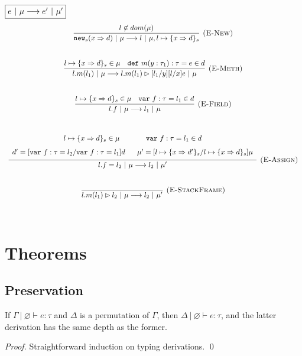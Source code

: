 \documentclass{llncs}
\newcommand{\keywadj}[1]{\mathtt{#1}}
\newcommand{\keyw}[1]{\keywadj{#1}~}
\begin{document}
$\fbox{$e~|~\mu \longrightarrow e'~|~\mu'$}$
\[
\begin{array}{c}
\infer[\textsc{(E-New)}]
  {\keywadj{new}_{s}(x \Rightarrow d)~|~\mu \longrightarrow l~|~\mu, l \mapsto \{ x \Rightarrow d \}_{s}}
  {l \not\in dom(\mu)}\\[5ex]

\infer[\textsc{(E-Meth)}]
  {l.m(l_1)~|~\mu \longrightarrow l.m(l_1) \rhd [l_1/y][l/x]e~|~\mu}
  {l \mapsto \{ x \Rightarrow d \}_{s} \in \mu & \keyw{def} m(y : \tau_1) : \tau = e \in d}\\[5ex]

\infer[\textsc{(E-Field)}]
  {l.f~|~\mu \longrightarrow l_1~|~\mu}
  {l \mapsto \{ x \Rightarrow d \}_{s} \in \mu & \keyw{var} f:\tau = l_1 \in d}\\[5ex]

\infer[\textsc{(E-Assign)}]
  {l.f = l_2~|~\mu \longrightarrow l_2~|~\mu'}
  {\def\arraystretch{1.6}
  \begin{array}{c}
l \mapsto \{ x \Rightarrow d \}_{s} \in \mu~~~~~~~~~~~\keyw{var} f:\tau = l_1 \in d \\
d' = [\keyw{var} f:\tau = l_2/\keyw{var} f:\tau = l_1]d~~~~~\mu' = [l \mapsto \{ x \Rightarrow d' \}_{s}/l \mapsto \{ x \Rightarrow d \}_{s}]\mu
  \end{array}}\\[5ex]

\infer[\textsc{(E-StackFrame)}]
  {l.m(l_1) \rhd l_2~|~\mu \longrightarrow l_2~|~\mu'}
  {}\\[5ex]
  
\end{array}
\]

\newpage

\section{Theorems}

\subsection{Preservation}

\begin{lemma}[Permutation]
If $\Gamma~|~\varnothing \vdash e : \tau$ and $\Delta$ is a permutation of $\Gamma$, then $\Delta~|~\varnothing \vdash e : \tau$, and the latter derivation has the same depth as the former.
\end{lemma}

\begin{proof}
Straightforward induction on typing derivations. \qed
\end{proof}
\end{document}
